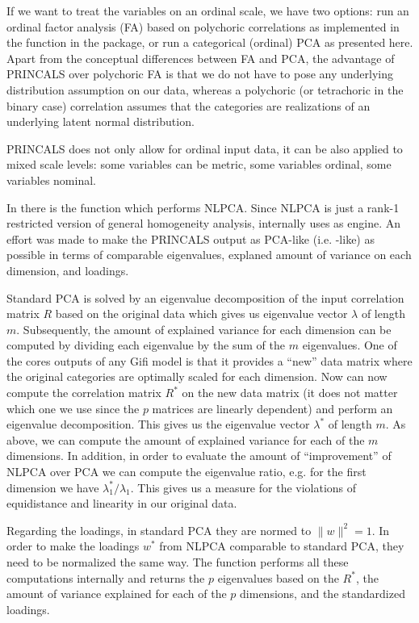 \documentclass[10pt,nojss,nofooter,fleqn]{jss}\usepackage[]{graphicx}\usepackage[]{color}
\begin{document}
If we want to treat the variables on an ordinal scale, we have two options: run an ordinal factor analysis (FA) based on polychoric correlations as implemented in the  function in the  package, or run a categorical (ordinal) PCA as presented here. Apart from the conceptual differences between FA and PCA, the advantage of PRINCALS over polychoric FA is that we do not have to pose any underlying distribution assumption on our data, whereas a polychoric (or tetrachoric in the binary case) correlation assumes that the categories are realizations of an underlying latent normal distribution. 

PRINCALS does not only allow for ordinal input data, it can be also applied to mixed scale levels: some variables can be metric, 
some variables ordinal, some variables nominal. 



In  there is the  function which performs NLPCA. Since NLPCA is just a rank-1 restricted 
version of general homogeneity analysis, internally  uses  as engine. An effort was made 
to make the PRINCALS output as PCA-like (i.e. -like) as possible in terms of comparable 
eigenvalues, explaned amount of variance on each dimension, and loadings.

Standard PCA is solved by an eigenvalue decomposition of the input correlation matrix $R$ based on the original 
data which gives us eigenvalue vector $\lambda$ of length $m$. Subsequently, the amount 
of explained variance for each dimension can be computed by dividing each eigenvalue by the sum of the $m$ eigenvalues. 
One of the cores outputs of any Gifi model is that it provides a ``new'' data matrix where the original categories are optimally scaled for each dimension. Now can now compute the correlation matrix $R^{\ast}$ on the new data matrix (it does not matter 
which one we use since the $p$ matrices are linearly dependent) and perform an eigenvalue decomposition. 
This gives us the eigenvalue vector $\lambda^{\ast}$ of length $m$. As above, we can compute the amount 
of explained variance for each of the $m$ dimensions. In addition, in order to evaluate the amount of ``improvement'' 
of NLPCA over PCA we can compute the eigenvalue ratio, e.g. for the first dimension we have $\lambda_1^{\ast}/\lambda_1$. 
This gives us a measure for the violations of equidistance and linearity in our original data. 

Regarding the loadings, in standard PCA they are normed to $\|w\|^2 = 1$. 
In order to make the loadings $w^{\ast}$ from NLPCA comparable to standard PCA, they need to be normalized the same way.
The  function performs all these computations internally and returns the $p$ eigenvalues based on the 
$R^{\ast}$, the amount of variance explained for each of the $p$ dimensions, and the standardized loadings. 
\end{document}
